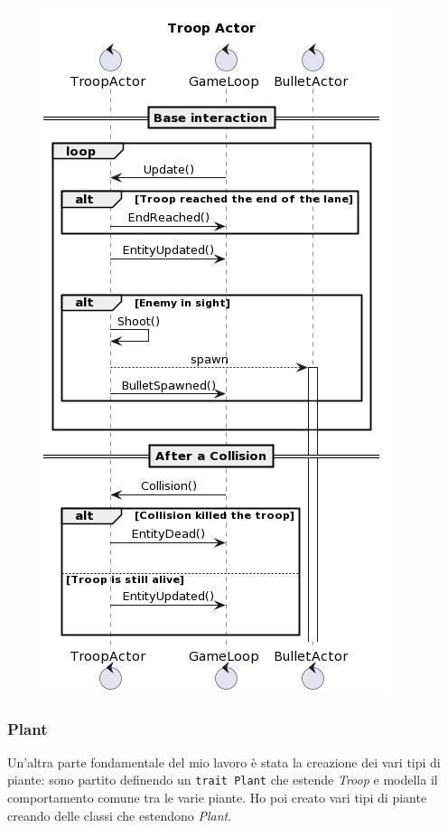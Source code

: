 \begin{figure}[H]
    \centering
    \includegraphics[width=0.8\linewidth]{images/troop-actor.png}
    \label{Diagramma di sequenza del Troop Actor.}
\end{figure}

\subsubsection{Plant}
Un'altra parte fondamentale del mio lavoro è stata la creazione dei vari tipi di piante: sono partito definendo un \texttt{trait Plant} che estende \textit{Troop} e modella il comportamento comune tra le varie piante.
Ho poi creato vari tipi di piante creando delle classi che estendono \textit{Plant}.

